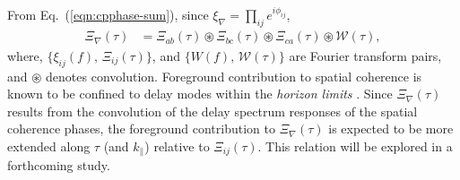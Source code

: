 \documentclass[
reprint,
superscriptaddress,
amsmath,
amssymb,
aps,
prd
]{revtex4-1}
\begin{document}
From Eq.~(\ref{eqn:cpphase-sum}), since $\xi_\nabla = \prod_{ij} e^{i\phi_{ij}}$,
\begin{align}
\Xi_\nabla(\tau) &= \Xi_{ab}(\tau)\circledast \Xi_{bc}(\tau)\circledast \Xi_{ca}(\tau)\circledast \mathcal{W}(\tau), \label{eqn:cpdspec-convolution}
\end{align}
where, $\{\xi_{ij}(f),\,\Xi_{ij}(\tau)\}$, and $\{W(f),\,\mathcal{W}(\tau)\}$ are Fourier transform pairs, and $\circledast$ denotes convolution.  Foreground contribution to spatial coherence is known to be confined to delay modes within the {\it horizon limits} 
\cite{bow09,liu09,liu14a,liu14b,dat10,liu11,gho12,mor12,par12b,tro12,ved12,dil13,pob13,thy13,thy15a,thy15b,thy16,dil14}. %
Since $\Xi_\nabla(\tau)$ results from the convolution of the delay spectrum responses of the spatial coherence phases, the foreground contribution to $\Xi_\nabla(\tau)$ is expected to be more extended along $\tau$ (and $k_\parallel$) relative to $\Xi_{ij}(\tau)$. This relation will be explored in a forthcoming study. 


\end{document}
